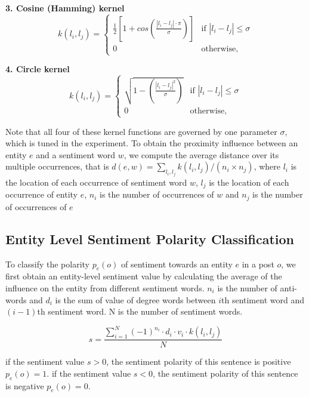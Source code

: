 \documentclass[runningheads]{llncs}
\begin{document}
\textbf{3. Cosine (Hamming) kernel}
\begin{equation}
k(l_i,l_j)=\begin{cases}
\frac{1}{2}\left[1+cos\left(\frac{|l_i-l_j|\cdot\pi}{\sigma}\right)\right] &\mbox{if $|l_i-l_j|\leq \sigma$}\\
0 &\mbox{otherwise},
\end{cases}
\end{equation}

\textbf{4. Circle kernel}
\begin{equation}
k(l_i,l_j)=\begin{cases}
\sqrt{1-\left(\frac{|l_i-l_j|^2}{\sigma}\right)} &\mbox{if $|l_i-l_j|\leq \sigma$}\\
0 &\mbox{otherwise},
\end{cases}
\end{equation}

Note that all four of these kernel functions are governed by one parameter $\sigma$, which is tuned in the experiment.
To obtain the proximity influence between an entity $e$ and a sentiment word $w$, we compute the average distance over its multiple occurrences, that is $d(e,w)=\sum_{l_i,l_j} k(l_i,l_j)/(n_i\times n_j)$, where $l_i$ is the location of each occurrence of sentiment word $w$, $l_j$ is the location of each occurrence of entity $e$, $n_i$ is the number of occurrences of $w$ and $n_j$ is the number of occurrences of $e$ %

\subsection{Entity Level Sentiment Polarity Classification}

To classify the polarity $p_e(o)$ of sentiment towards an entity $e$ in a post $o$, we first obtain an entity-level sentiment value by calculating the average of the influence  on the entity from different sentiment words. $n_i$ is the number of anti-words and $d_i$ is the sum of value of degree words between $i$th sentiment word and $(i-1)$th sentiment word. N is the number of sentiment words.



\begin{equation}\label{equ:entitysentiment}
s = \frac{\sum_{i=1}^{N}(-1)^{n_i}\cdot d_i\cdot v_i\cdot k(l_i,l_j)}{N}
\end{equation}

%
if the sentiment value $s>0$, the sentiment polarity of this sentence is positive $p_e(o)=1$. if the sentiment value $s<0$, the sentiment polarity of this sentence is negative $p_e(o)=0$. %
\end{document}
